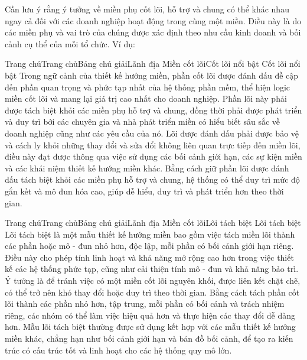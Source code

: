 Cần lưu ý rằng ý tưởng về miền phụ cốt lõi, hỗ trợ và chung có thể khác nhau ngay cả đối với các doanh nghiệp hoạt động trong cùng một miền. Điều này là do các miền phụ và vai trò của chúng được xác định theo nhu cầu kinh doanh và bối cảnh cụ thể của mỗi tổ chức. Ví dụ:


Trang chủTrang chủBảng chú giảiLãnh địa Miền cốt lõiCốt lõi nổi bật
Cốt lõi nổi bật
Trong ngữ cảnh của thiết kế hướng miền, phần cốt lõi được đánh dấu đề cập đến phần quan trọng và phức tạp nhất của hệ thống phần mềm, thể hiện logic miền cốt lõi và mang lại giá trị cao nhất cho doanh nghiệp. Phần lõi này phải được tách biệt khỏi các miền phụ hỗ trợ và chung, đồng thời phải được phát triển và duy trì bởi các chuyên gia và nhà phát triển miền có hiểu biết sâu sắc về doanh nghiệp cũng như các yêu cầu của nó. Lõi được đánh dấu phải được bảo vệ và cách ly khỏi những thay đổi và sửa đổi không liên quan trực tiếp đến miền lõi, điều này đạt được thông qua việc sử dụng các bối cảnh giới hạn, các sự kiện miền và các khái niệm thiết kế hướng miền khác. Bằng cách giữ phần lõi được đánh dấu tách biệt khỏi các miền phụ hỗ trợ và chung, hệ thống có thể duy trì mức độ gắn kết và mô đun hóa cao, giúp dễ hiểu, duy trì và phát triển hơn theo thời gian.



Trang chủTrang chủBảng chú giảiLãnh địa Miền cốt lõiLõi tách biệt
Lõi tách biệt
Lõi tách biệt là một mẫu thiết kế hướng miền bao gồm việc tách miền lõi thành các phần hoặc mô - đun nhỏ hơn, độc lập, mỗi phần có bối cảnh giới hạn riêng. Điều này cho phép tính linh hoạt và khả năng mở rộng cao hơn trong việc thiết kế các hệ thống phức tạp, cũng như cải thiện tính mô - đun và khả năng bảo trì. Ý tưởng là để tránh việc có một miền cốt lõi nguyên khối, được liên kết chặt chẽ, có thể trở nên khó thay đổi hoặc duy trì theo thời gian. Bằng cách tách phần cốt lõi thành các phần nhỏ hơn, tập trung, mỗi phần có bối cảnh và trách nhiệm riêng, các nhóm có thể làm việc hiệu quả hơn và thực hiện các thay đổi dễ dàng hơn. Mẫu lõi tách biệt thường được sử dụng kết hợp với các mẫu thiết kế hướng miền khác, chẳng hạn như bối cảnh giới hạn và bản đồ bối cảnh, để tạo ra kiến trúc có cấu trúc tốt và linh hoạt cho các hệ thống quy mô lớn.

